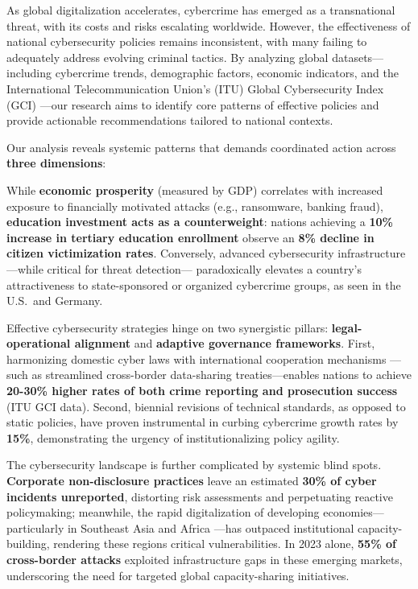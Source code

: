 
\vspace*{-3em}
As global digitalization accelerates,
cybercrime has emerged as a transnational threat, with its costs and risks escalating worldwide.
However, the effectiveness of national cybersecurity policies remains inconsistent,
with many failing to adequately address evolving criminal tactics.
By analyzing global datasets—including cybercrime trends, demographic factors, economic indicators,
and the International Telecommunication Union’s (ITU) Global Cybersecurity Index (GCI)
—our research aims to identify core patterns of effective policies and
provide actionable recommendations tailored to national contexts.


Our analysis reveals systemic patterns that demands coordinated action across \textbf{three dimensions}:

While \textbf{economic prosperity} (measured by GDP) correlates with increased exposure to financially
motivated attacks (e.g., ransomware, banking fraud), \textbf{education investment acts as a counterweight}:
nations achieving a \textbf{10\% increase in tertiary education enrollment}
observe an \textbf{8\% decline in citizen victimization rates}.
Conversely, advanced cybersecurity infrastructure—while critical for threat detection—
paradoxically elevates a country’s attractiveness to state-sponsored or organized cybercrime groups,
as seen in the U.S.\ and Germany.

Effective cybersecurity strategies hinge on two synergistic pillars:
\textbf{legal-operational alignment} and \textbf{adaptive governance frameworks}.
First, harmonizing domestic cyber laws with international cooperation mechanisms
—such as streamlined cross-border data-sharing treaties—enables nations to achieve
\textbf{20-30\% higher rates of both crime reporting and prosecution success} (ITU GCI data).
Second, biennial revisions of technical standards, as opposed to static policies,
have proven instrumental in curbing cybercrime growth rates by \textbf{15\%},
demonstrating the urgency of institutionalizing policy agility.

The cybersecurity landscape is further complicated by systemic blind spots.
\textbf{Corporate non-disclosure practices} leave an estimated \textbf{30\% of cyber incidents unreported},
distorting risk assessments and perpetuating reactive policymaking;
meanwhile, the rapid digitalization of developing economies—particularly in Southeast Asia and Africa
—has outpaced institutional capacity-building, rendering these regions critical vulnerabilities.
In 2023 alone, \textbf{55\% of cross-border attacks} exploited infrastructure gaps in these emerging markets,
underscoring the need for targeted global capacity-sharing initiatives.



